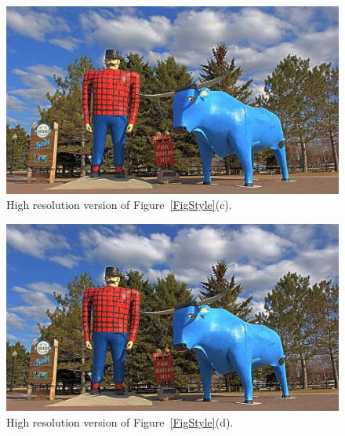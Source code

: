 \begin{figure}
\begin{center}
\includegraphics[width=\textwidth]{figures/chapter5/style_based/PaulBunyan_hdrcandy_w0_1_small.jpg}
\caption{High resolution version of Figure~\ref{FigStyle}(c).}
\end{center}
\end{figure}

\begin{figure}
\begin{center}
\includegraphics[width=\textwidth]{figures/chapter5/style_based/PaulBunyan_hdrcandy_w0_w1_w2_small.jpg}
\caption{High resolution version of Figure~\ref{FigStyle}(d).}
\end{center}
\end{figure}

